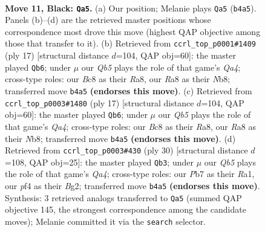 \documentclass[11pt]{article}
\begin{document}
\clearpage

\begin{figure}[p]\centering
\begin{subfigure}{0.46\textwidth}\centering
\resizebox{\linewidth}{!}{%
\newchessgame
\chessboard[
  setfen={rnb2rk1/ppp2p1p/1n2p1p1/3pP2P/1q1P1PP1/2N5/PPP5/1R1QKBNR b K - 0 11},
  showmover=false,
  pgfstyle=straightmove, color=movearrow, markmove={b4-a5}
]}
\caption{}
\end{subfigure}\hfill
\begin{subfigure}{0.46\textwidth}\centering
\resizebox{\linewidth}{!}{%
\newchessgame
\chessboard[
  setfen={rnb2rk1/pp2ppbp/3p1np1/q7/2PpP3/1NN1BP2/PP4PP/R2QKB1R b KQ - 1 9},
  showmover=false,
  pgfstyle=straightmove, color=movearrow, markmove={a5-b6}
]}
\caption{}
\end{subfigure}
\\[4pt]
\begin{subfigure}{0.46\textwidth}\centering
\resizebox{\linewidth}{!}{%
\newchessgame
\chessboard[
  setfen={rnb2rk1/pp2ppbp/3p1np1/q7/2PpP3/1NN1BP2/PP4PP/R2QKB1R b KQ - 1 9},
  showmover=false,
  pgfstyle=straightmove, color=movearrow, markmove={a5-b6}
]}
\caption{}
\end{subfigure}\hfill
\begin{subfigure}{0.46\textwidth}\centering
\resizebox{\linewidth}{!}{%
\newchessgame
\chessboard[
  setfen={r2qr1k1/1b1n1pbp/1pp3p1/p2p4/Q2P3P/P1N1PNP1/1P3PB1/R2R2K1 w - - 0 16},
  showmover=false,
  pgfstyle=straightmove, color=movearrow, markmove={a4-b3}
]}
\caption{}
\end{subfigure}
\caption{\textbf{Move 11, Black: \texttt{Qa5}.} (a) Our position; Melanie plays \texttt{Qa5} (\texttt{b4a5}). Panels (b)--(d) are the retrieved master positions whose correspondence most drove this move (highest QAP objective among those that transfer to it). (b) Retrieved from \texttt{ccrl\_top\_p0001\#1409} (ply 17) [structural distance $d$=104, QAP obj=60]: the master played \texttt{Qb6}; under $\mu$ our \emph{Qb5} plays the role of that game's \emph{Qa4}; cross-type roles: our \emph{B}c8 as their \emph{R}a8, our \emph{R}a8 as their \emph{N}b8; transferred move \texttt{b4a5} \textbf{(endorses this move)}. (c) Retrieved from \texttt{ccrl\_top\_p0003\#1480} (ply 17) [structural distance $d$=104, QAP obj=60]: the master played \texttt{Qb6}; under $\mu$ our \emph{Qb5} plays the role of that game's \emph{Qa4}; cross-type roles: our \emph{B}c8 as their \emph{R}a8, our \emph{R}a8 as their \emph{N}b8; transferred move \texttt{b4a5} \textbf{(endorses this move)}. (d) Retrieved from \texttt{ccrl\_top\_p0003\#430} (ply 30) [structural distance $d$=108, QAP obj=25]: the master played \texttt{Qb3}; under $\mu$ our \emph{Qb5} plays the role of that game's \emph{Qa4}; cross-type roles: our \emph{P}b7 as their \emph{R}a1, our \emph{p}f4 as their \emph{B}g2; transferred move \texttt{b4a5} \textbf{(endorses this move)}. Synthesis: 3 retrieved analogs transferred to \texttt{Qa5} (summed QAP objective 145, the strongest correspondence among the candidate moves); Melanie committed it via the \texttt{search} selector.}
\label{fig:thought-m21}
\end{figure}
\end{document}
